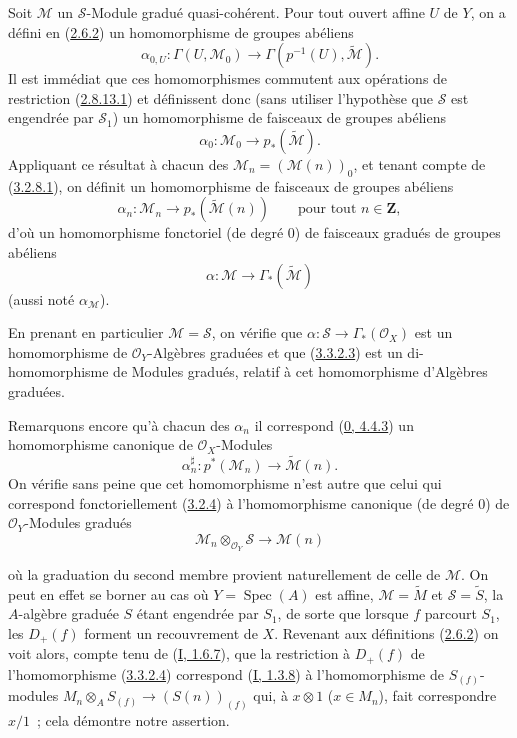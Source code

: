 \begin{env}[3.3.2]
\label{II.3.3.2-fr}
Soit $\mathcal{M}$ un $\mathcal{S}$-Module gradué quasi-cohérent. Pour tout
ouvert affine $U$ de $Y$, on a défini en
(\hyperref[II.2.6.2-fr]{2.6.2}) un homomorphisme de groupes abéliens
\[
  \alpha_{0,U}:\Gamma(U,\mathcal{M}_0)
  \longrightarrow\Gamma(p^{-1}(U),\widetilde{\mathcal{M}}).
\]
Il est immédiat que ces homomorphismes commutent aux opérations de restriction
(\hyperref[II.2.8.13.1-fr]{2.8.13.1}) et définissent donc (sans utiliser
l'hypothèse que $\mathcal{S}$ est engendrée par $\mathcal{S}_1$) un
homomorphisme de faisceaux de groupes abéliens
\[
\label{II.3.3.2.1-fr}
  \alpha_0:\mathcal{M}_0\longrightarrow p_*(\widetilde{\mathcal{M}}).
\tag{3.3.2.1}
\]
Appliquant ce résultat à chacun des
$\mathcal{M}_n=(\mathcal{M}(n))_0$, et tenant compte de
(\hyperref[II.3.2.8.1-fr]{3.2.8.1}), on définit un homomorphisme de faisceaux
de groupes abéliens
\[
\label{II.3.3.2.2-fr}
  \alpha_n:\mathcal{M}_n\longrightarrow
  p_*(\widetilde{\mathcal{M}}(n))
  \qquad\text{pour tout }n\in\mathbf{Z},
\tag{3.3.2.2}
\]
d'où un homomorphisme fonctoriel (de degré $0$) de faisceaux gradués de groupes
abéliens
\[
\label{II.3.3.2.3-fr}
  \alpha:\mathcal{M}\longrightarrow\Gamma_*(\widetilde{\mathcal{M}})
\tag{3.3.2.3}
\]
(aussi noté $\alpha_{\mathcal{M}}$).

En prenant en particulier $\mathcal{M}=\mathcal{S}$, on vérifie que
$\alpha:\mathcal{S}\to\Gamma_*(\mathcal{O}_X)$ est un homomorphisme de
$\mathcal{O}_Y$-Algèbres graduées et que
(\hyperref[II.3.3.2.3-fr]{3.3.2.3}) est un di-homomorphisme de Modules
gradués, relatif à cet homomorphisme d'Algèbres graduées.

Remarquons encore qu'à chacun des $\alpha_n$ il correspond
(\hyperref[0.4.4.3-fr]{0, 4.4.3}) un homomorphisme canonique de
$\mathcal{O}_X$-Modules
\[
\label{II.3.3.2.4-fr}
  \alpha_n^\sharp:p^*(\mathcal{M}_n)
  \longrightarrow\widetilde{\mathcal{M}}(n).
\tag{3.3.2.4}
\]
On vérifie sans peine que cet homomorphisme n'est autre que celui qui
correspond fonctoriellement (\hyperref[II.3.2.4-fr]{3.2.4}) à
l'homomorphisme canonique (de degré $0$) de $\mathcal{O}_Y$-Modules gradués
\[
\label{II.3.3.2.5-fr}
  \mathcal{M}_n\otimes_{\mathcal{O}_Y}\mathcal{S}
  \longrightarrow\mathcal{M}(n)
\tag{3.3.2.5}
\]


où la graduation du second membre provient naturellement de celle de
$\mathcal{M}$. On peut en effet se borner au cas où
$Y=\operatorname{Spec}(A)$ est affine, $\mathcal{M}=\widetilde{M}$ et
$\mathcal{S}=\widetilde{S}$, la $A$-algèbre graduée $S$ étant engendrée par
$S_1$, de sorte que lorsque $f$ parcourt $S_1$, les $D_+(f)$ forment un
recouvrement de $X$. Revenant aux définitions
(\hyperref[II.2.6.2-fr]{2.6.2}) on voit alors, compte tenu de
(\hyperref[I.1.6.7-fr]{I, 1.6.7}), que la restriction à $D_+(f)$ de
l'homomorphisme (\hyperref[II.3.3.2.4-fr]{3.3.2.4}) correspond
(\hyperref[I.1.3.8-fr]{I, 1.3.8}) à l'homomorphisme de $S_{(f)}$-modules
$M_n\otimes_A S_{(f)}\to(S(n))_{(f)}$ qui, à $x\otimes1$ ($x\in M_n$), fait
correspondre $x/1$~; cela démontre notre assertion.
\end{env}

